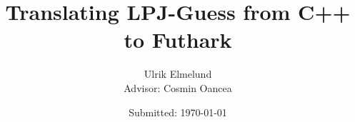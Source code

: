 
\author{Ulrik Elmelund\\ {\small{} Advisor: Cosmin Oancea}}
\date{Submitted: \today}
\title{Translating LPJ-Guess from C++ to Futhark}

\maketitle
\tableofcontents










\printbibliography


